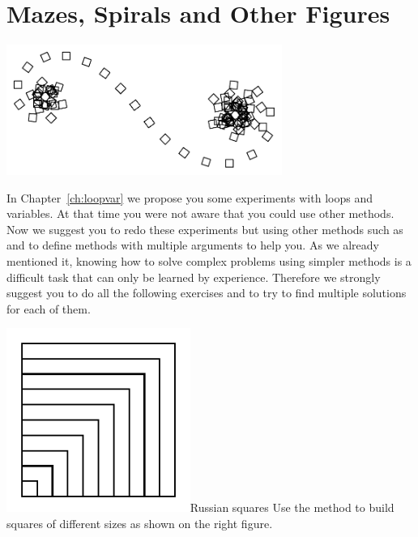  \ifx\wholebook\relax\else



\fi

\chapter{Mazes, Spirals and Other Figures}\label{ch:xploopvar}

\begin{chapterfigure}
\includegraphics[width=9cm]{varLoopsfixedLengthSpiralfirstwithSquare}
\end{chapterfigure}

In Chapter~\ref{ch:loopvar} we propose you some experiments with loops and variables. At that time you were not aware that you could use other methods. Now we suggest you to redo these experiments but using other methods such as  and to define methods with multiple arguments to help you. As we already mentioned it, knowing how to solve complex problems using simpler methods is a difficult task that can only be learned by experience. Therefore we strongly suggest you to do all the following exercises and to try to find multiple solutions for each of them. 

\begin{exofigwithsizeandtitle}[0.5]{\includegraphics[width=6cm]{Argmirescr}}{Russian squares}\label{exo:russianSquares2}
Use the method  to build squares of different sizes as shown on the right figure.
\end{exofigwithsizeandtitle}

